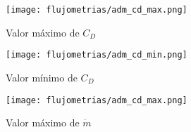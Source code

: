 \begin{figure}[ht]
    \centering
    \texttt{[image: flujometrias/adm\_cd\_max.png]}
    \caption{Valor máximo de $C_{D}$}\label{fig:esc_cd_max}
\end{figure}

\begin{figure}[ht]
    \centering
    \texttt{[image: flujometrias/adm\_cd\_min.png]}
    \caption{Valor mínimo de $C_{D}$}\label{fig:esc_cd_min}
\end{figure}

\begin{figure}[ht]
    \centering
    \texttt{[image: flujometrias/adm\_cd\_max.png]}
    \caption{Valor máximo de $\dot{m}$}\label{fig:esc_m_max}
\end{figure}

